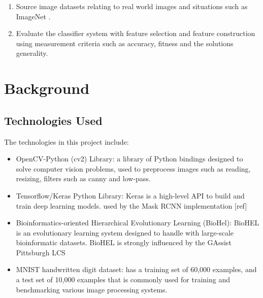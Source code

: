 \begin{enumerate}
\begin{enumerate}
		\item Source image datasets relating to real world images and situations such as ImageNet \cite{imagenet}.
		
		\item Evaluate the classifier system with feature selection and feature construction using measurement criteria such as accuracy, fitness and the solution\textquotesingle s generality.
	\end{enumerate}
		
	
\end{enumerate}
\chapter{Background}
\section{Technologies Used}
The technologies in this project include:
\begin{itemize}
\item OpenCV-Python (cv2) Library: a library of Python bindings designed to solve computer vision problems, used to preprocess images such as reading, resizing, filters such as canny and low-pass. 
\item Tensorflow/Keras Python Library: Keras is a high-level API to build and train deep learning models. used by the Mask RCNN implementation [ref]
\item Bioinformatics-oriented Hierarchical Evolutionary Learning (BioHel): BioHEL is an evolutionary learning system designed to handle with large-scale bioinformatic datasets. BioHEL is strongly influenced by the GAssist Pittsburgh LCS
\item MNIST handwritten digit dataset: has a training set of 60,000 examples, and a test set of 10,000 examples  that is commonly used for training and benchmarking various image processing systems.
\end{itemize}

